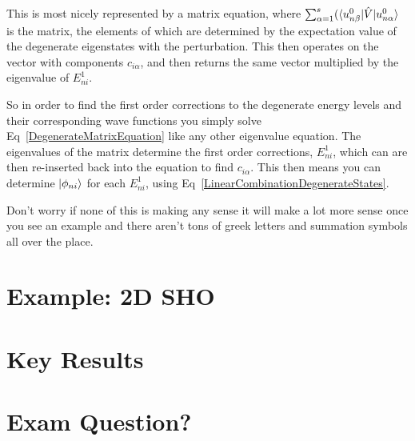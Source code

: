 \noindent This is most nicely represented by a matrix equation, where $\sum^s_{\alpha = 1} (\braket{u^0_{n\beta} | \Hat{V} | u^0_{n\alpha}}$ is the matrix, the elements of which are determined by the expectation value of the degenerate eigenstates with the perturbation. This then operates on the vector with components $c_{i \alpha}$, and then returns the same vector multiplied by the eigenvalue of $E^1_{ni}$.

\noindent So in order to find the first order corrections to the degenerate energy levels and their corresponding wave functions you simply solve Eq~\ref{DegenerateMatrixEquation} like any other eigenvalue equation. The eigenvalues of the matrix determine the first order corrections, $E^1_{ni}$, which can are then re-inserted back into the equation to find $c_{i \alpha}$. This then means you can determine $\ket{\phi_{ni}}$ for each $E^1_{ni}$, using Eq~\ref{LinearCombinationDegenerateStates}.

\noindent Don't worry if none of this is making any sense it will make a lot more sense once you see an example and there aren't tons of greek letters and summation symbols all over the place.


\section{Example: 2D SHO}

\section{Key Results}

\section{Exam Question?}


